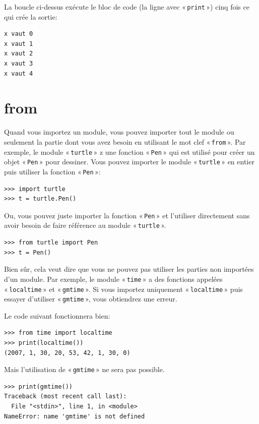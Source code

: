 La boucle ci-dessus exécute le bloc de code (la ligne avec « \texttt{print} ») cinq fois ce qui crée la sortie:
\begin{Verbatim}[frame=single,rulecolor=\color{gray}]
x vaut 0
x vaut 1
x vaut 2
x vaut 3
x vaut 4
\end{Verbatim}

\section*{from}
Quand vous importez un module, vous pouvez importer tout le module ou seulement la partie dont vous avez besoin en utilisant le mot clef « \texttt{from} ». Par exemple, le module « \texttt{turtle} » z une fonction  « \texttt{Pen} » qui est utilisé pour créer un objet « \texttt{Pen} » pour dessiner. Vous pouvez importer le module « \texttt{turtle} » en entier puis utiliser la fonction « \texttt{Pen} »:

\begin{Verbatim}[frame=single,rulecolor=\color{gray}]
>>> import turtle
>>> t = turtle.Pen()
\end{Verbatim}

Ou, vous pouvez juste importer la fonction « \texttt{Pen} » et l'utiliser directement sans avoir besoin de faire référence au module « \texttt{turtle} ».

\begin{Verbatim}[frame=single,rulecolor=\color{gray}]
>>> from turtle import Pen
>>> t = Pen()
\end{Verbatim}

Bien sûr, cela veut dire que vous ne pouvez pas utiliser les parties non importées d'un module. Par exemple, le module « \texttt{time} » a des fonctions appelées « \texttt{localtime} » et « \texttt{gmtime} ». Si vous importez uniquement « \texttt{localtime} » puis essayer d'utiliser « \texttt{gmtime} », vous obtiendrez une erreur.

Le code suivant fonctionnera bien:
\begin{Verbatim}[frame=single,rulecolor=\color{gray}]
>>> from time import localtime
>>> print(localtime())
(2007, 1, 30, 20, 53, 42, 1, 30, 0)
\end{Verbatim}

Mais l'utilisation de « \texttt{gmtime} » ne sera pas possible. 
\begin{Verbatim}[frame=single,rulecolor=\color{gray}]
>>> print(gmtime())
Traceback (most recent call last):
  File "<stdin>", line 1, in <module>
NameError: name 'gmtime' is not defined
\end{Verbatim}

